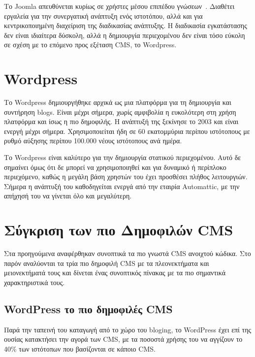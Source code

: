 \documentclass[12pt]{report}
\begin{document}
Το \textlatin{Joomla} απευθύνεται κυρίως σε χρήστες μέσου επιπέδου γνώσεων~\cite{pixelmedia}. Διαθέτει εργαλεία για την συνεργατική ανάπτυξη ενός ιστοτόπου, αλλά και για κεντρικοποιημένη διαχείριση της διαδικασίας ανάπτυξης. Η διαδικασία εγκατάστασης δεν είναι ιδιαίτερα δύσκολη, αλλά η δημιουργία περιεχομένου δεν είναι τόσο εύκολη σε σχέση με το επόμενο προς εξέταση \textlatin{CMS}, το \textlatin{Wordpress}.

\section{\textlatin{Wordpress}}
Το \textlatin{Wordpress} δημιουργήθηκε αρχικά ως μια πλατφόρμα για τη δημιουργία και συντήρηση \textlatin{blogs}. Είναι μέχρι σήμερα, χωρίς αμφιβολία η ευκολότερη στη χρήση πλατφόρμα και ίσως η πιο δημοφιλής. Η ανάπτυξή της ξεκίνησε το 2003 και είναι ενεργή μέχρι σήμερα. Χρησιμοποιείται ήδη σε 60 εκατομμύρια περίπου ιστότοπους με ρυθμό αύξησης περίπου 100.000 νέους ιστότοπους ανά ημέρα.

Το \textlatin{Wordpress} είναι καλύτερο για την δημιουργία στατικού περιεχομένου. Αυτό δε σημαίνει όμως ότι δε μπορεί να χρησιμοποιηθεί και για δυναμικό ή περίπλοκο περιεχόμενο, καθώς η μεγάλη βάση χρηστών του έχει προσθέσει πλήθος λειτουργιών. Σήμερα η ανάπτυξή του καθοδηγείται ενεργά από την εταιρία \textlatin{Automattic}, με την απήχησή του να γίνεται όλο και μεγαλύτερη.

\section{Σύγκριση των πιο Δημοφιλών \textlatin{CMS}}
Στα προηγούμενα αναφέρθηκαν συνοπτικά τα πιο γνωστά \textlatin{CMS} ανοιχτού κώδικα. Στο παρόν αναλύονται τα τρία πιο δημοφιλή \textlatin{CMS} με τα πλεονεκτήματα και μειονεκτήματά τους και δίνεται ένας συνοπτικός πίνακας με τα πιο σημαντικά χαρακτηριστικά τους.

\subsection{\textlatin{WordPress} το πιο δημοφιλές \textlatin{CMS}}
Παρά την ταπεινή του καταγωγή από το χώρο του \textlatin{bloging}, το \textlatin{WordPress} έχει επί της ουσίας κατακτήσει την αγορά των \textlatin{CMS}, με τα ποσοστά χρήσης του να αγγίζουν το 40\% των ιστότοπων που βασίζονται σε κάποιο \textlatin{CMS}.
\end{document}
